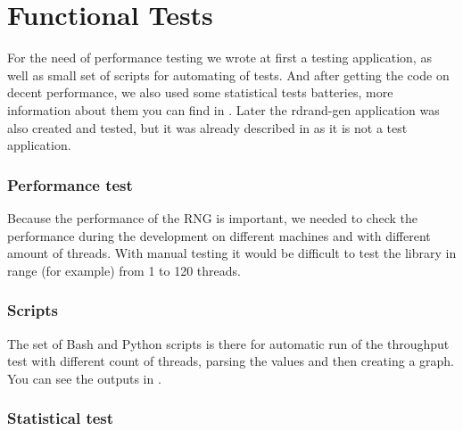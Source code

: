 
\chapter{Functional Tests} \label{chap:tests}
For the need of performance testing we wrote at first a testing application, as well as small set of scripts for automating of tests. And after getting the code on decent performance, we also used some statistical tests batteries, more information about them you can find in . Later the rdrand-gen application was also created and tested, but it was already described in  as it is not a test application.


\subsection{Performance test}
Because the performance of the RNG is important, we needed to check the performance during the development on different machines and with different amount of threads. With manual testing it would be difficult to test the library in range (for example) from 1 to 120 threads.

\subsection{Scripts}
The set of Bash and Python scripts is there for automatic run of the throughput test with different count of threads, parsing the values and then creating a graph. You can see the outputs in .

\subsection{Statistical test}


